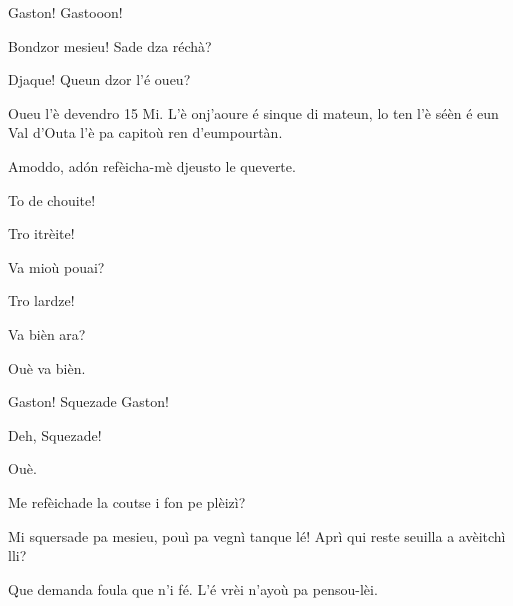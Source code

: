 \begin{drama}

\PersEmpourtantaspeaks Gaston! Gastooon!


\Eunfeurmispeaks Bondzor mesieu! Sade dza réchà?

\PersEmpourtantaspeaks Djaque!  Queun dzor l'é oueu? 

\Eunfeurmispeaks Oueu l'è devendro 15 Mi. L'è onj'aoure é sinque di mateun, lo ten l'è séèn é eun Val d'Outa l'è pa capitoù ren d'eumpourtàn.

\PersEmpourtantaspeaks Amoddo, ad\'on refèicha-mè djeusto le queverte.

\Eunfeurmispeaks To de chouite!


\PersEmpourtantaspeaks Tro itrèite! 

\Eunfeurmispeaks{} Va mioù pouai?

\PersEmpourtantaspeaks Tro lardze!


\Eunfeurmispeaks Va bièn ara?

\PersEmpourtantaspeaks Ouè va bièn.


\Casimirspeaks Gaston! Squezade Gaston! 


\Casimirspeaks Deh, Squezade! 

\Eunfeurmispeaks Ouè.

\Casimirspeaks Me refèichade la coutse i fon pe plèizì?

\Eunfeurmispeaks Mi squersade pa mesieu, pouì pa vegnì tanque lé! Aprì qui reste seuilla a avèitchì lli?

\Casimirspeaks Que demanda foula que n’i fé. L’é vrèi n’ayoù pa pensou-lèi.





\end{drama}
